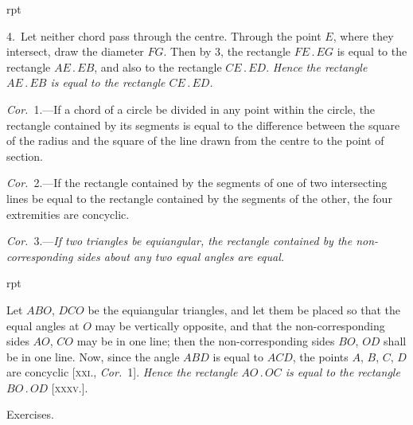 \documentclass[oneside]{book}
\newcounter{wrapwidth}
\newcommand\exhead[1]{
\Needspace*{5\baselineskip}\begin{center}
\textsf{#1}
\end{center}
}
\newcommand\imgflow[3]{
\setcounter{wrapwidth}{#1}

\begin{wrapfigure}[#2]{r}{\value{wrapwidth}pt}
\begin{center}
\vspace{-0.3in}

\end{center}
\end{wrapfigure}
}
\begin{document}
\imgflow{112}{10}{f145}

4.~Let neither chord pass through the centre.
Through the\label{thopoint} point $E$, where they
intersect, draw the diameter $FG$.
Then by 3, the rectangle $FE\,.\,EG$
is equal to the rectangle $AE\,.\,EB$,
and also to the rectangle $CE\,.\,ED$.
\emph{Hence the rectangle $AE\,.\,EB$ is
equal to the rectangle $CE\,.\,ED$.}

\emph{Cor.}~1.---If a chord of a circle
be divided in any point within
the circle, the rectangle contained by its segments is
equal to the difference between the square of the
radius and the square of the line drawn from the
centre to the point of section.

\emph{Cor.}~2.---If the rectangle contained by the segments
of one of two intersecting lines be equal to the rectangle
contained by the segments of the other, the four
extremities are concyclic.

\textit{Cor.}~3.---\textit{If two triangles be equiangular, the rectangle
contained by the non-corresponding
sides about any two equal angles are
equal.}


\imgflow{100}{9}{f146}
Let $ABO$, $DCO$ be the equiangular
triangles, and let them be
placed so that the equal angles at
$O$ may be vertically opposite, and
that the non-corresponding sides
$AO$, $CO$ may be in one line; then
the non-corresponding sides $BO$, $OD$ shall be in one
line. Now, since the angle $ABD$ is equal to $ACD$, the
points $A$, $B$, $C$, $D$ are concyclic\label{concylic2} [\textsc{xxi.}, \emph{Cor.}~1]. \emph{Hence
the rectangle $AO\,.\,OC$ is equal to the rectangle $BO\,.\,OD$}
[\textsc{xxxv}.].

\exhead{Exercises.}
\end{document}
